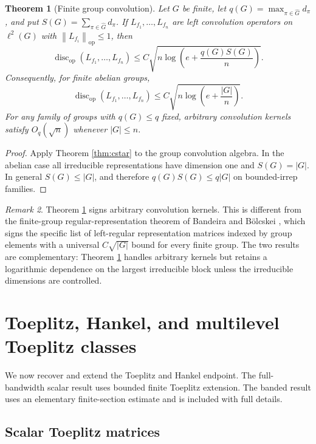 \documentclass[11pt]{amsart}
\numberwithin{equation}{section}
\newtheorem{theorem}{Theorem}[section]
\theoremstyle{definition}
\theoremstyle{remark}
\newtheorem{remark}[theorem]{Remark}
\newcommand{\op}{\mathrm{op}}
\newcommand{\discop}{\operatorname{disc}_{\op}}
\newcommand{\norm}[1]{\left\lVert #1\right\rVert}
\begin{document}
\begin{theorem}[Finite group convolution]\label{thm:group}
Let $G$ be finite, let $q(G)=\max_{\pi\in\widehat G}d_\pi$, and put
$S(G)=\sum_{\pi\in\widehat G}d_\pi$. If
$L_{f_1},\ldots,L_{f_n}$ are left convolution operators on $\ell^2(G)$ with
$\norm{L_{f_i}}_{\op}\le 1$, then
\[
\discop(L_{f_1},\ldots,L_{f_n})
\le C\sqrt{n\log\left(e+\frac{q(G)S(G)}{n}\right)} .
\]
Consequently, for finite abelian groups,
\[
\discop(L_{f_1},\ldots,L_{f_n})
\le C\sqrt{n\log\left(e+\frac{|G|}{n}\right)} .
\]
For any family of groups with $q(G)\le q$ fixed, arbitrary convolution kernels
satisfy $O_q(\sqrt n)$ whenever $|G|\le n$.
\end{theorem}

\begin{proof}
Apply Theorem \ref{thm:cstar} to the group convolution algebra. In the
abelian case all irreducible representations have dimension one and
$S(G)=|G|$. In general $S(G)\le |G|$, and therefore $q(G)S(G)\le q|G|$ on
bounded-irrep families.
\end{proof}

\begin{remark}
Theorem \ref{thm:group} signs arbitrary convolution kernels. This is
different from the finite-group regular-representation theorem of Bandeira and
B\"olcskei \cite{BandeiraBolcskei}, which signs the specific list of left-regular
representation matrices indexed by group elements with a universal
$C\sqrt{|G|}$ bound for every finite group. The two results are complementary:
Theorem \ref{thm:group} handles arbitrary kernels but retains a logarithmic
dependence on the largest irreducible block unless the irreducible dimensions
are controlled.
\end{remark}

\section{Toeplitz, Hankel, and multilevel Toeplitz classes}

We now recover and extend the Toeplitz and Hankel endpoint. The full-bandwidth
scalar result uses bounded finite Toeplitz extension. The banded result uses an
elementary finite-section estimate and is included with full details.

\subsection{Scalar Toeplitz matrices}
\end{document}
